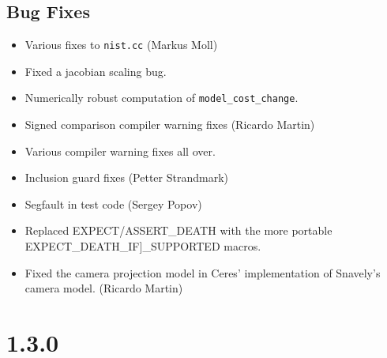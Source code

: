 \subsection{Bug Fixes}
\begin{itemize}
\item Various fixes to \texttt{nist.cc} (Markus Moll)
\item Fixed a jacobian scaling bug.
\item Numerically robust computation of \texttt{model\_cost\_change}.
\item Signed comparison compiler warning fixes (Ricardo Martin)
\item Various compiler warning fixes all over.
\item Inclusion guard fixes (Petter Strandmark)
\item Segfault in test code (Sergey Popov)
\item Replaced EXPECT/ASSERT\_DEATH with the more portable
  EXPECT\_DEATH\_IF]\_SUPPORTED macros.
\item Fixed the camera projection model in Ceres' implementation of
  Snavely's camera model. (Ricardo Martin)
\end{itemize}


\section*{1.3.0}
